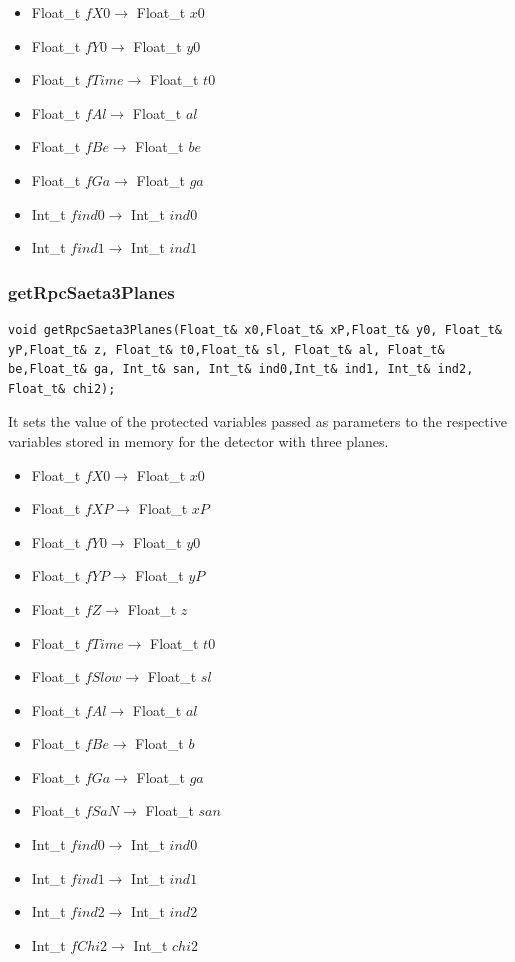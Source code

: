 \documentclass[a4paper]{book}
\begin{document}
\begin{itemize}
	\item Float\_t $fX0 \rightarrow$ Float\_t $x0$
	\item Float\_t $fY0 \rightarrow$ Float\_t $y0$
	\item Float\_t $fTime \rightarrow$ Float\_t $t0$
	\item Float\_t $fAl \rightarrow$ Float\_t $al$
	\item Float\_t $fBe \rightarrow$ Float\_t $be$
	\item Float\_t $fGa \rightarrow$ Float\_t $ga$
	\item Int\_t $find0 \rightarrow$ Int\_t $ind0$
	\item Int\_t $find1 \rightarrow$ Int\_t $ind1$
\end{itemize}

\subsubsection{getRpcSaeta3Planes}

\begin{lstlisting}[style=customc]
void getRpcSaeta3Planes(Float_t& x0,Float_t& xP,Float_t& y0, Float_t& yP,Float_t& z, Float_t& t0,Float_t& sl, Float_t& al, Float_t& be,Float_t& ga, Int_t& san, Int_t& ind0,Int_t& ind1, Int_t& ind2, Float_t& chi2);
\end{lstlisting}

It sets the value of the protected variables passed as parameters to the respective variables stored in memory for the detector with three planes.

\begin{itemize}
	\item Float\_t $fX0 \rightarrow$ Float\_t $x0$
	\item Float\_t $fXP \rightarrow$ Float\_t $xP$
	\item Float\_t $fY0 \rightarrow$ Float\_t $y0$
	\item Float\_t $fYP \rightarrow$ Float\_t $yP$
	\item Float\_t $fZ \rightarrow$ Float\_t $z$
	\item Float\_t $fTime \rightarrow$ Float\_t $t0$
	\item Float\_t $fSlow \rightarrow$ Float\_t $sl$
	\item Float\_t $fAl \rightarrow$ Float\_t $al$
	\item Float\_t $fBe \rightarrow$ Float\_t $b$
	\item Float\_t $fGa \rightarrow$ Float\_t $ga$
	\item Float\_t $fSaN \rightarrow$ Float\_t $san$
	\item Int\_t $find0 \rightarrow$ Int\_t $ind0$
	\item Int\_t $find1 \rightarrow$ Int\_t $ind1$
	\item Int\_t $find2 \rightarrow$ Int\_t $ind2$
	\item Int\_t $fChi2 \rightarrow$ Int\_t $chi2$
\end{itemize}
\end{document}
